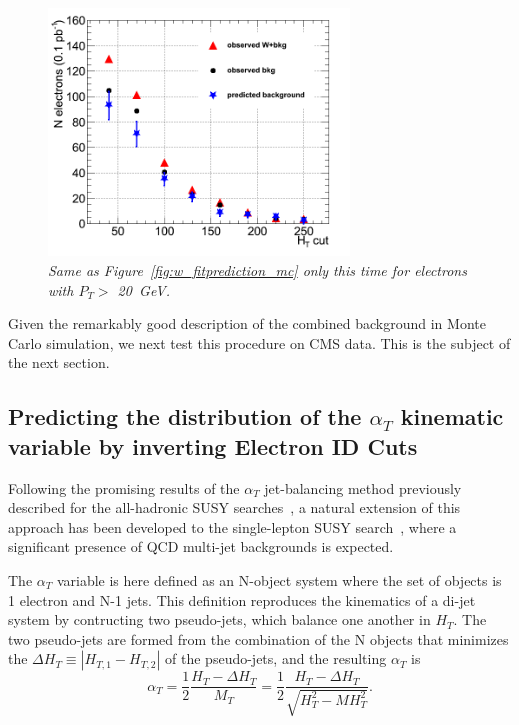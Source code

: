 \begin{figure}[h!]
\centering
\includegraphics[width=80mm]{Plots/w_fitprediction_pt20_METanticut_vsHT_MC.png}
\caption{\textit{Same as Figure~\ref{fig:w_fitprediction_mc} only this time for electrons with $P_{T}>$ 20~GeV. }}
\label{fig:w_fitprediction_mc_pt20}
\end{figure}


Given the remarkably good description of the combined background in Monte Carlo simulation, we next test this procedure on CMS data.  This is the subject of the next section.

\subsection{Predicting the distribution of the $\alpha{_T}$ kinematic variable by inverting Electron ID Cuts}

Following the promising results of the $\alpha_{T}$ jet-balancing method previously described for the all-hadronic SUSY searches~\cite{njet}, a natural extension of this approach has been developed to the single-lepton SUSY search~\cite{ouratnote}, where a significant presence of QCD multi-jet backgrounds is expected.

The $\alpha_{T}$ variable is here defined as an N-object system where the set of objects is 1 electron and N-1 jets. This definition reproduces the kinematics of a di-jet system by contructing two pseudo-jets, which balance one another in $H_{T}$. The two pseudo-jets are formed from the combination of the N objects that minimizes the $\Delta H_{T} \equiv |H_{T,1} - H_{T,2}|$ of the pseudo-jets, and the resulting  $\alpha_{T}$ is
\begin{equation}
\alpha_{T} = \frac{1}{2} \frac{H_{T} - \Delta H_{T}}{M_{T}} =  \frac{1}{2} \frac{H_{T} - \Delta H_{T}}{\sqrt{H_{T}^{2}-MH_{T}^{2}}}.
\end{equation}

